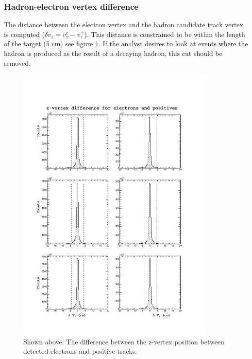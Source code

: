 \subsubsection*{Hadron-electron vertex difference}
The distance between the electron vertex and the hadron candidate track vertex is computed ($\delta v_{z} = v_{z}^{e} - v_{z}^{+}$).  This distance is constrained to be within the length of the target (5 cm) see figure \ref{fig:dvz}.  If the analyst desires to look at events where the hadron is produced as the result of a decaying hadron, this cut should be removed.  

\begin{figure}
  \label{fig:dvz}
  \begin{center}
    \includegraphics[width=10cm]{image/plots/hadron-id/dvz.pdf}
    \caption{Shown above: The difference between the z-vertex position between detected electrons and positive tracks.}
  \end{center}
\end{figure}


%
%

